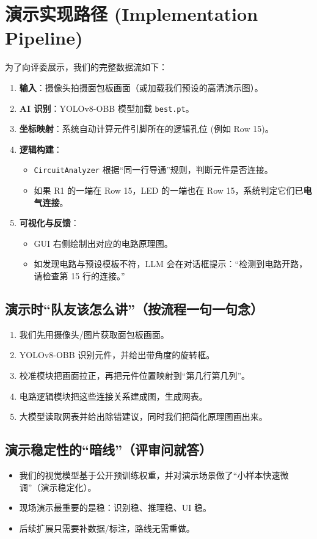 \documentclass[a4paper,AutoFakeBold,oneside,12pt]{book}
\begin{document}
\chapter{演示实现路径 (Implementation Pipeline)}

为了向评委展示，我们的完整数据流如下：
\begin{enumerate}
    \item \textbf{输入}：摄像头拍摄面包板画面（或加载我们预设的高清演示图）。
    \item \textbf{AI 识别}：YOLOv8-OBB 模型加载 \texttt{best.pt}。
    \item \textbf{坐标映射}：系统自动计算元件引脚所在的逻辑孔位 (例如 Row 15)。
    \item \textbf{逻辑构建}：
    \begin{itemize}
        \item \texttt{CircuitAnalyzer} 根据“同一行导通”规则，判断元件是否连接。
        \item 如果 R1 的一端在 Row 15，LED 的一端也在 Row 15，系统判定它们已\textbf{电气连接}。
    \end{itemize}
    \item \textbf{可视化与反馈}：
    \begin{itemize}
        \item GUI 右侧绘制出对应的电路原理图。
        \item 如发现电路与预设模板不符，LLM 会在对话框提示：“检测到电路开路，请检查第 15 行的连接。”
    \end{itemize}
\end{enumerate}

\section{演示时“队友该怎么讲”（按流程一句一句念）}
\begin{enumerate}
    \item 我们先用摄像头/图片获取面包板画面。
    \item YOLOv8-OBB 识别元件，并给出带角度的旋转框。
    \item 校准模块把画面拉正，再把元件位置映射到“第几行第几列”。
    \item 电路逻辑模块把这些连接关系建成图，生成网表。
    \item 大模型读取网表并给出除错建议，同时我们把简化原理图画出来。
\end{enumerate}

\section{演示稳定性的“暗线”（评审问就答）}
\begin{itemize}
    \item 我们的视觉模型基于公开预训练权重，并对演示场景做了“小样本快速微调”（演示稳定化）。
    \item 现场演示最重要的是稳：识别稳、推理稳、UI 稳。
    \item 后续扩展只需要补数据/标注，路线无需重做。
\end{itemize}
\end{document}
